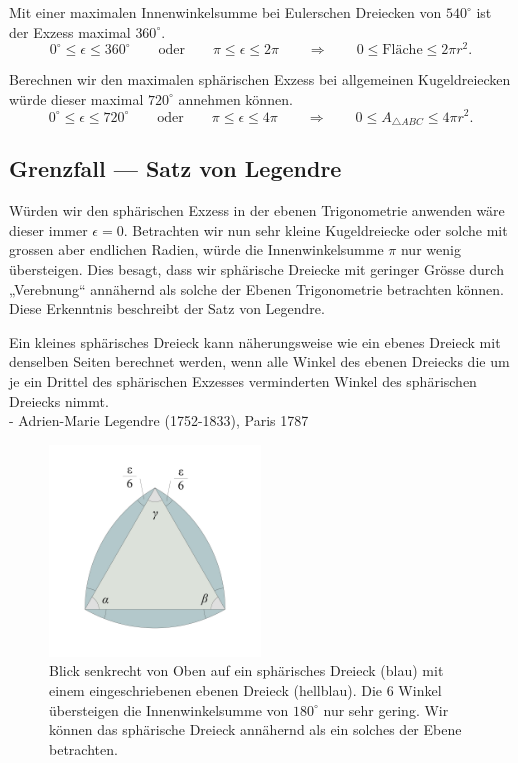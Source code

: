 \begin{refsection}
Mit einer maximalen Innenwinkelsumme bei Eulerschen Dreiecken von
$540^{\circ}$ ist der Exzess maximal $360^{\circ}$.
\[
0^{\circ} \le \epsilon \le 360^{\circ}
\qquad \text{oder} \qquad
\pi \le \epsilon \le 2\pi
\qquad \Rightarrow \qquad
0 \le \text{Fläche} \le 2 \pi r^2.
\]

Berechnen wir den maximalen sphärischen Exzess bei allgemeinen
Kugeldreiecken würde dieser maximal $720^{\circ}$ annehmen können.
\[
0^{\circ} \le \epsilon \le 720^{\circ}
\qquad \text{oder} \qquad
\pi \le \epsilon \le 4\pi
\qquad \Rightarrow \qquad
0 \le A_{\triangle{ ABC }} \le 4 \pi r^2.
\]


\subsection{Grenzfall --- Satz von Legendre}
Würden wir den sphärischen Exzess in der ebenen Trigonometrie
anwenden wäre dieser immer $\epsilon=0$. Betrachten wir nun sehr
kleine Kugeldreiecke oder solche mit grossen aber endlichen Radien,
würde die Innenwinkelsumme $\pi$ nur wenig übersteigen. Dies besagt,
dass wir sphärische Dreiecke mit geringer Grösse durch „Verebnung“
annähernd als solche der Ebenen Trigonometrie betrachten können.
Diese Erkenntnis beschreibt der Satz von Legendre.

\begin{satz}Ein kleines sphärisches Dreieck kann näherungsweise 
wie ein ebenes Dreieck mit denselben Seiten berechnet 
werden, wenn alle Winkel des ebenen Dreiecks die um 
je ein Drittel des sphärischen Exzesses verminderten 
Winkel des sphärischen Dreiecks nimmt. 
\\
\quad \quad - Adrien-Marie Legendre (1752-1833), Paris 1787
\label{skript:kugel:satz:Legendre}
\end{satz}
%

\begin{figure}[htbp]
\centering
\includegraphics[width=0.5\textwidth]{kugel/SphaerischerExzess.jpg}
\caption{Blick senkrecht von Oben auf ein sphärisches Dreieck (blau)
mit einem eingeschriebenen ebenen Dreieck (hellblau). Die 6 Winkel
übersteigen die Innenwinkelsumme von $180^{\circ}$ nur sehr gering.
Wir können das sphärische Dreieck annähernd als ein solches der
Ebene betrachten.}
\end{figure}


\end{refsection}
